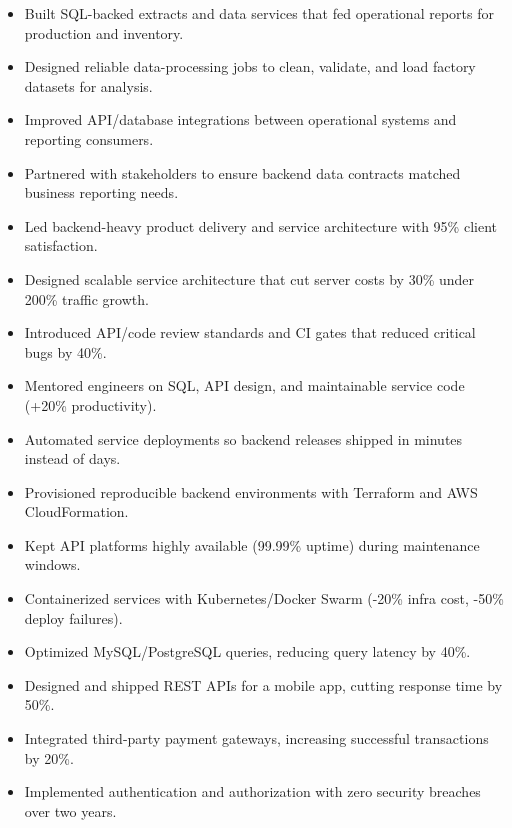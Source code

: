 
\begin{itemize}
\item Built SQL-backed extracts and data services that fed operational reports for production and inventory.
\item Designed reliable data-processing jobs to clean, validate, and load factory datasets for analysis.
\item Improved API/database integrations between operational systems and reporting consumers.
\item Partnered with stakeholders to ensure backend data contracts matched business reporting needs.
\end{itemize}
\divider

\begin{itemize}
\item Led backend-heavy product delivery and service architecture with 95\% client satisfaction.
\item Designed scalable service architecture that cut server costs by 30\% under 200\% traffic growth.
\item Introduced API/code review standards and CI gates that reduced critical bugs by 40\%.
\item Mentored engineers on SQL, API design, and maintainable service code (+20\% productivity).
\end{itemize}
\divider

\begin{itemize}
\item Automated service deployments so backend releases shipped in minutes instead of days.
\item Provisioned reproducible backend environments with Terraform and AWS CloudFormation.
\item Kept API platforms highly available (99.99\% uptime) during maintenance windows.
\item Containerized services with Kubernetes/Docker Swarm (-20\% infra cost, -50\% deploy failures).
\end{itemize}
\divider

\begin{itemize}
\item Optimized MySQL/PostgreSQL queries, reducing query latency by 40\%.
\item Designed and shipped REST APIs for a mobile app, cutting response time by 50\%.
\item Integrated third-party payment gateways, increasing successful transactions by 20\%.
\item Implemented authentication and authorization with zero security breaches over two years.
\end{itemize}
\divider

